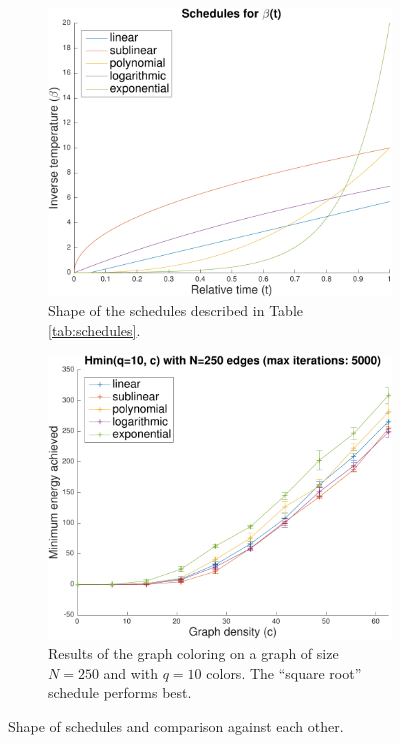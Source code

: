 \documentclass{article}
\begin{document}
  \begin{figure}[h]
    \centering
    \begin{subfigure}[t]{.5\linewidth}
      \centering
      \includegraphics[width=.8\linewidth]{figures/schedules_shape.pdf}
      \caption{Shape of the schedules described in Table \ref{tab:schedules}.}
      \label{fig:schedules_shape}
    \end{subfigure}%
    \begin{subfigure}[t]{.5\linewidth}
      \centering
      \includegraphics[width=.8\linewidth]{figures/schedules_evaluation.pdf}
      \caption{Results of the graph coloring on a graph of size $N=250$ and with $q=10$ colors. The ``square root'' schedule performs best.}
      \label{fig:schedules_evaluation}
    \end{subfigure}
    \caption{Shape of schedules and comparison against each other.}
    \label{fig:schedules}
  \end{figure}
\end{document}
